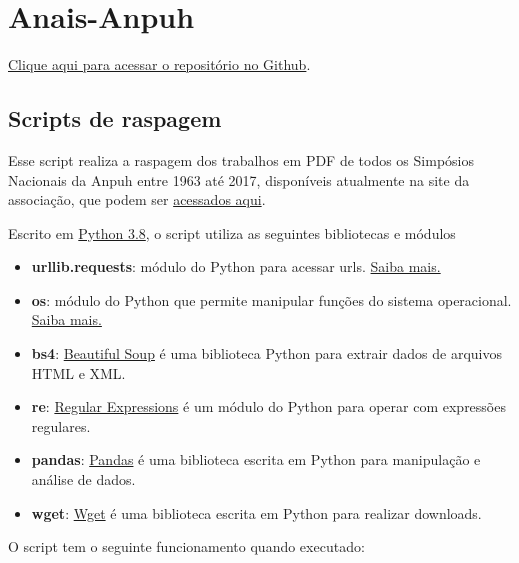 \documentclass[
]{book}
\providecommand{\tightlist}{%
  \setlength{\itemsep}{0pt}\setlength{\parskip}{0pt}}
\begin{document}
\hypertarget{anais-anpuh}{%
\section{Anais-Anpuh}\label{anais-anpuh}}

\href{https://github.com/LABHDUFBA/Anais-Anpuh}{Clique aqui para acessar o repositório no Github}.

\hypertarget{scripts-de-raspagem}{%
\subsection{Scripts de raspagem}\label{scripts-de-raspagem}}

Esse script realiza a raspagem dos trabalhos em PDF de todos os Simpósios Nacionais da Anpuh entre 1963 até 2017, disponíveis atualmente na site da associação, que podem ser \href{https://anpuh.org.br/index.php/documentos/anais}{acessados aqui}.

Escrito em \href{https://www.python.org/}{Python 3.8}, o script utiliza as seguintes bibliotecas e módulos

\begin{itemize}
\tightlist
\item
  \textbf{urllib.requests}: módulo do Python para acessar urls. \href{https://docs.python.org/pt-br/3/library/urllib.request.htmll}{Saiba mais.}
\item
  \textbf{os}: módulo do Python que permite manipular funções do sistema operacional. \href{https://docs.python.org/pt-br/3/library/os.html}{Saiba mais.}
\item
  \textbf{bs4}: \href{https://www.crummy.com/software/BeautifulSoup/bs4/doc/}{Beautiful Soup} é uma biblioteca Python para extrair dados de arquivos HTML e XML.
\item
  \textbf{re}: \href{https://docs.python.org/pt-br/3/library/re.html}{Regular Expressions} é um módulo do Python para operar com expressões regulares.
\item
  \textbf{pandas}: \href{https://pandas.pydata.org/}{Pandas} é uma biblioteca escrita em Python para manipulação e análise de dados.
\item
  \textbf{wget}: \href{https://pypi.org/project/wget/}{Wget} é uma biblioteca escrita em Python para realizar downloads.
\end{itemize}

O script tem o seguinte funcionamento quando executado:
\end{document}
